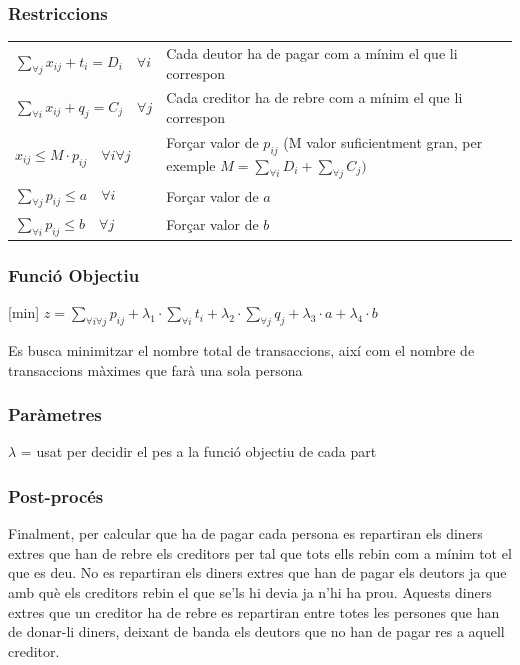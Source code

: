 \subsubsection{Restriccions}
\begin{tabular}{l l}
$\sum\limits_{\forall j} x_{ij} + t_{i} = D_{i} \quad \forall i$ & Cada deutor ha de pagar com a mínim el que li correspon \\

$\sum\limits_{\forall i} x_{ij} + q_{j} = C_{j} \quad \forall j$ & Cada creditor ha de rebre com a mínim el que li correspon \\

$x_{ij} \leq M \cdot p_{ij} \quad \forall i \forall j$ & Forçar valor de $p_{ij}$ (M valor suficientment gran, per exemple $M=\sum\limits_{\forall i} D_{i} + \sum\limits_{\forall j} C_{j})$\\

$\sum\limits_{\forall j} p_{ij} \leq a \quad \forall i$ & Forçar valor de $a$ \\

$\sum\limits_{\forall i} p_{ij} \leq b \quad \forall j$ & Forçar valor de $b$ \\
\end{tabular}

\subsubsection{Funció Objectiu}
[min] $z = \sum\limits_{\forall i \forall j} p_{ij} + \lambda_{1} \cdot \sum\limits_{\forall i} t_{i} + \lambda_{2} \cdot \sum\limits_{\forall j} q_{j} + \lambda_{3} \cdot a + \lambda_{4} \cdot b $

Es busca minimitzar el nombre total de transaccions, així com el nombre de transaccions màximes que farà una sola persona
\subsubsection{Paràmetres}
$\lambda$ = usat per decidir el pes a la funció objectiu de cada part

\subsubsection{Post-procés}
Finalment, per calcular que ha de pagar cada persona es repartiran els diners extres que han de rebre els creditors per tal que tots ells rebin com a mínim tot el que es deu. No es repartiran els diners extres que han de pagar els deutors ja que amb què els creditors rebin el que se'ls hi devia ja n'hi ha prou. Aquests diners extres que un creditor ha de rebre es repartiran entre totes les persones que han de donar-li diners, deixant de banda els deutors que no han de pagar res a aquell creditor. 


